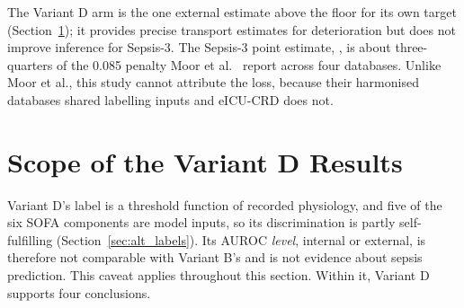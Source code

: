 The Variant D arm is the one external estimate above the floor for its own
target (Section~\ref{sec:variant_d_establishes}); it provides precise
transport estimates for deterioration but does not improve inference for
Sepsis-3. The Sepsis-3 point estimate, \pcHFiveEst, is about three-quarters of
the 0.085 penalty Moor et al.\ \cite{moor2023review} report across four
databases. Unlike Moor et al., this study cannot attribute the loss, because
their harmonised databases shared labelling inputs and eICU-CRD does not.


\section{Scope of the Variant D Results}
\label{sec:variant_d_establishes}

Variant D's label is a threshold function of recorded physiology, and five of
the six SOFA components are model inputs, so its discrimination is partly
self-fulfilling (Section~\ref{sec:alt_labels}). Its AUROC \emph{level}, internal
or external, is therefore not comparable with Variant B's and is not evidence
about sepsis prediction. This caveat applies throughout this section. Within
it, Variant D supports four conclusions.

